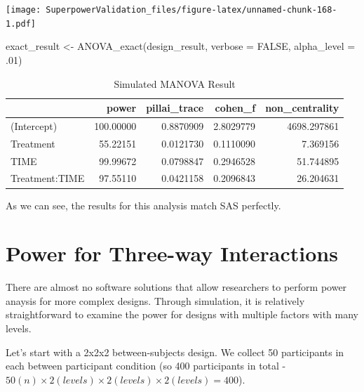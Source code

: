\documentclass[
]{book}
\newenvironment{Shaded}{\begin{snugshade}}{\end{snugshade}}
\newcommand{\AttributeTok}[1]{\textcolor[rgb]{0.77,0.63,0.00}{#1}}
\newcommand{\ConstantTok}[1]{\textcolor[rgb]{0.00,0.00,0.00}{#1}}
\newcommand{\DecValTok}[1]{\textcolor[rgb]{0.00,0.00,0.81}{#1}}
\newcommand{\FunctionTok}[1]{\textcolor[rgb]{0.00,0.00,0.00}{#1}}
\newcommand{\NormalTok}[1]{#1}
\newcommand{\OtherTok}[1]{\textcolor[rgb]{0.56,0.35,0.01}{#1}}
\begin{document}
\texttt{[image: SuperpowerValidation\_files/figure-latex/unnamed-chunk-168-1.pdf]}

\begin{Shaded}
\begin{Highlighting}[]
\NormalTok{exact\_result }\OtherTok{\textless{}{-}} \FunctionTok{ANOVA\_exact}\NormalTok{(design\_result, }\AttributeTok{verbose =} \ConstantTok{FALSE}\NormalTok{,}
                            \AttributeTok{alpha\_level =}\NormalTok{ .}\DecValTok{01}\NormalTok{)}
\end{Highlighting}
\end{Shaded}

\begin{table}[!h]

\caption{\label{tab:unnamed-chunk-169}Simulated MANOVA Result}
\centering
\begin{tabular}[t]{l|r|r|r|r}
\hline
  & power & pillai\_trace & cohen\_f & non\_centrality\\
\hline
(Intercept) & 100.00000 & 0.8870909 & 2.8029779 & 4698.297861\\
\hline
Treatment & 55.22151 & 0.0121730 & 0.1110090 & 7.369156\\
\hline
TIME & 99.99672 & 0.0798847 & 0.2946528 & 51.744895\\
\hline
Treatment:TIME & 97.55110 & 0.0421158 & 0.2096843 & 26.204631\\
\hline
\end{tabular}
\end{table}

As we can see, the results for this analysis match SAS perfectly.

\hypertarget{power-for-three-way-interactions}{%
\chapter{Power for Three-way Interactions}\label{power-for-three-way-interactions}}

There are almost no software solutions that allow researchers to perform power anaysis for more complex designs. Through simulation, it is relatively straightforward to examine the power for designs with multiple factors with many levels.

Let's start with a 2x2x2 between-subjects design. We collect 50 participants in each between participant condition (so 400 participants in total - \(50(n)\times2(levels)\times2(levels)\times2(levels)= 400\)).
\end{document}

